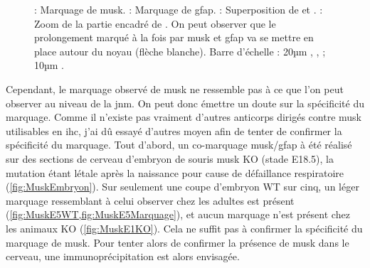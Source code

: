 \begin{figure}[h]
{			 : Marquage de \gls{musk}.
			 : Marquage de \gls{gfap}.
			 : Superposition de  et .
			 : Zoom de la partie encadré de . On peut observer que le prolongement marqué à la fois par \gls{musk} et \gls{gfap} va se mettre en place autour du noyau (flèche blanche).
			Barre d'échelle : 20µm , ,  ; 10µm .
				}	
		\label{fig:colocalisation}
	\end{figure}
	
	Cependant, le marquage observé de \gls{musk} ne ressemble pas à ce que l'on peut observer au niveau de la \gls{jnm}.  On peut donc émettre un doute sur la spécificité du marquage. Comme il n'existe pas vraiment d'autres anticorps dirigés contre \gls{musk} utilisables en \gls{ihc}, j'ai dû essayé d'autres moyen afin de tenter de confirmer la spécificité du marquage. Tout d'abord, un co-marquage \gls{musk}/\acrshort{gfap} à été réalisé sur des sections de cerveau d'embryon de souris \gls{musk} KO (stade E18.5), la mutation étant létale après la naissance pour cause de défaillance respiratoire (\cref{fig:MuskEmbryon}). Sur seulement une coupe d'embryon WT sur cinq, un léger marquage ressemblant à celui observer chez les adultes est présent (\cref{fig:MuskE5WT,fig:MuskE5Marquage}), et aucun marquage n'est présent chez les animaux KO (\cref{fig:MuskE1KO}). Cela ne suffit pas à confirmer la spécificité du marquage de \gls{musk}. Pour tenter alors de confirmer la présence de \gls{musk} dans le cerveau, une immunoprécipitation est alors envisagée.
	
